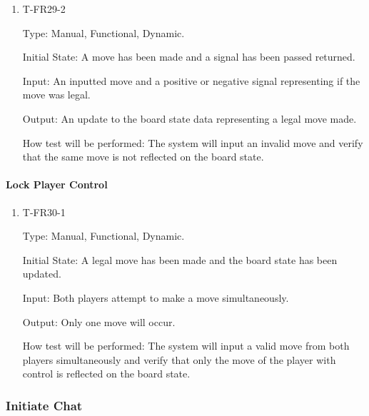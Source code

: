 \documentclass[12pt, titlepage]{article}
\begin{document}
        \begin{enumerate}

        \item{T-FR29-2\\}

            Type: Manual, Functional, Dynamic.
            					
            Initial State: A move has been made and a signal has been passed returned.
            					
            Input: An inputted move and a positive or negative signal representing if the move was legal.
            					
            Output: An update to the board state data representing a legal move made.

            How test will be performed: The system will input an invalid move and verify that the same move is not reflected on the board state.

        \end{enumerate}
    
    \paragraph{Lock Player Control}

        \begin{enumerate}

        \item{T-FR30-1\\}

            Type: Manual, Functional, Dynamic.
            					
            Initial State: A legal move has been made and the board state has been updated.
            					
            Input: Both players attempt to make a move simultaneously.
            					
            Output: Only one move will occur.

            How test will be performed: The system will input a valid move from both players simultaneously and verify that only the move of the player with control is reflected on the board state.

        \end{enumerate}

\subsubsection{Initiate Chat}
		
\end{document}
